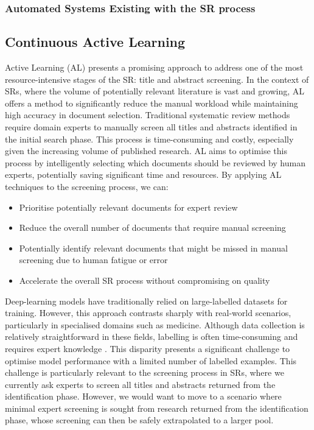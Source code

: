 \documentclass[10pt, english]{article}
\begin{document}
\subsubsection{Automated Systems Existing with the SR process}

\subsection{Continuous Active Learning}
Active Learning (AL) presents a promising approach to address one of the most resource-intensive stages of the SR: title and abstract screening. In the context of SRs, where the volume of potentially relevant literature is vast and growing, AL offers a method to significantly reduce the manual workload while maintaining high accuracy in document selection.
Traditional systematic review methods require domain experts to manually screen all titles and abstracts identified in the initial search phase. This process is time-consuming and costly, especially given the increasing volume of published research. AL aims to optimise this process by intelligently selecting which documents should be reviewed by human experts, potentially saving significant time and resources.
By applying AL techniques to the screening process, we can:
\begin{itemize}
    \item Prioritise potentially relevant documents for expert review
    \item Reduce the overall number of documents that require manual screening
    \item Potentially identify relevant documents that might be missed in manual screening due to human fatigue or error
    \item Accelerate the overall SR process without compromising on quality
\end{itemize}

Deep-learning models have traditionally relied on large-labelled datasets for training. However, this approach contrasts sharply with real-world scenarios, particularly in specialised domains such as medicine. Although data collection is relatively straightforward in these fields, labelling is often time-consuming and requires expert knowledge \cite{smith_less_2018, hoi_batch_2006}. This disparity presents a significant challenge to optimise model performance with a limited number of labelled examples. This challenge is particularly relevant to the screening process in SRs, where we currently ask experts to screen all titles and abstracts returned from the identification phase. However, we would want to move to a scenario where minimal expert screening is sought from research returned from the identification phase, whose screening can then be safely extrapolated to a larger pool.
\end{document}
